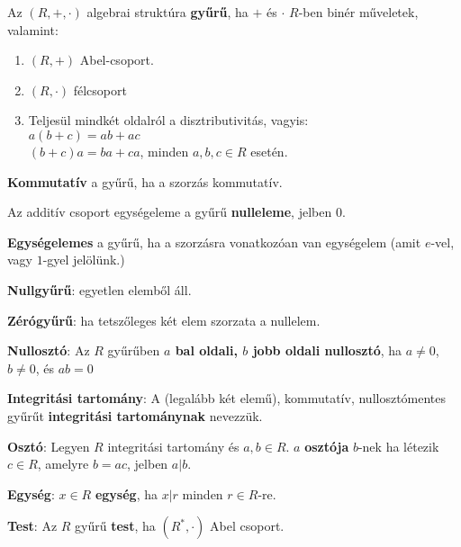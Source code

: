 \begin{frame}
  \begin{tcolorbox}[title={Def.: Gyűrűk}]
    Az $(R, +, {\cdot})$ algebrai struktúra \textbf{gyűrű}, ha $+$ és $\cdot$ $R$-ben binér műveletek, valamint:\\
    \begin{enumerate}
      \item $(R, +)$ Abel-csoport.
      \item $(R, {\cdot})$ félcsoport
      \item Teljesül mindkét oldalról a disztributivitás, vagyis:\\
      $a(b + c) = ab + ac$\\
      $(b+ c)a = ba + ca$, minden $a, b, c \in R$ esetén.
    \end{enumerate}
    \mbigskip

    \textbf{Kommutatív} a gyűrű, ha a szorzás kommutatív.\\
    \mmedskip

    Az additív csoport egységeleme a gyűrű \textbf{nulleleme}, jelben 0.\\
    \mmedskip

    \textbf{Egységelemes} a gyűrű, ha a szorzásra vonatkozóan van egységelem (amit $e$-vel, vagy $1$-gyel jelölünk.)\\
    \mmedskip

    \textbf{Nullgyűrű}: egyetlen elemből áll.\\
    \mmedskip

    \textbf{Zérógyűrű}: ha tetszőleges két elem szorzata a nullelem.\\
    \mmedskip

    \textbf{Nullosztó}: Az $R$ gyűrűben \textbf{$a$ bal oldali, $b$ jobb oldali nullosztó}, ha $a \neq 0$, $b \neq 0$, és $ab = 0$\\
    \mmedskip

    \textbf{Integritási tartomány}: A (legalább két elemű), kommutatív, nullosztómentes gyűrűt \textbf{integritási tartománynak} nevezzük.\\
    \mmedskip

    \textbf{Osztó}: Legyen $R$ integritási tartomány és $a, b \in R$. $a$ \textbf{osztója} $b$-nek ha létezik $c \in R$, amelyre $b = ac$, jelben $a | b$.\\
    \mmedskip

    \textbf{Egység}: $x \in R$ \textbf{egység}, ha $x | r$ minden $r \in R$-re.\\
    \mmedskip

    \textbf{Test}: Az $R$ gyűrű \textbf{test}, ha $(R^*, {\cdot})$ Abel csoport.
  \end{tcolorbox}
\end{frame}


